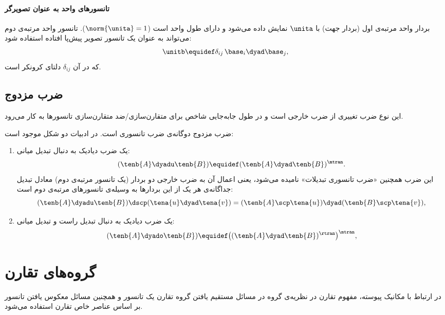 \paragraph{تانسورهای واحد به عنوان تصویرگر} بردار واحد مرتبه‌ی اول (بردار جهت) با $\unita$ نمایش داده می‌شود و دارای طول واحد است ($\norm{\unita}=1$). تانسور واحد مرتبه‌ی دوم می‌تواند به عنوان یک تانسور تصویر پیش‌پا افتاده استفاده شود:
\begin{equation}\label{eq:unitb}
    \unitb\equidef\delta_{ij}\,\base_i\dyad \base_j,
\end{equation}
که در آن $\delta_{ij}$ دلتای کرونکر است.

\subsection{ضرب مزدوج}
این نوع ضرب تغییری از ضرب خارجی است و در طول جابه‌جایی شاخص برای متقارن‌سازی/ضد متقارن‌سازی تانسورها به کار می‌رود.

\begin{definition}
    ضرب مزدوج دوگانه‌ی ضرب تانسوری است. در ادبیات دو شکل موجود است:
    \begin{enumerate}
        \item یک ضرب دیادیک به دنبال تبدیل میانی:
              \begin{equation}
                  (\tenb{A}\dyadu\tenb{B})\equidef(\tenb{A}\dyad\tenb{B})^\mtran.
              \end{equation}
              این ضرب همچنین «ضرب تانسوری تبدیلات» نامیده می‌شود، یعنی اعمال آن به ضرب خارجی دو بردار (یک تانسور مرتبه‌ی دوم) معادل تبدیل جداگانه‌ی هر یک از این بردارها به وسیله‌ی تانسورهای مرتبه‌ی دوم است:
              \begin{equation}
                  (\tenb{A}\dyadu\tenb{B})\dscp(\tena{u}\dyad\tena{v})= (\tenb{A}\scp\tena{u})
                  \dyad(\tenb{B}\scp\tena{v}),
              \end{equation}

        \item یک ضرب دیادیک به دنبال تبدیل راست و تبدیل میانی:
              \begin{equation}
                  (\tenb{A}\dyado\tenb{B})\equidef\big((\tenb{A}\dyad\tenb{B})^\rtran\big)^\mtran,
              \end{equation}
    \end{enumerate}
\end{definition}

\section{گروه‌های تقارن}
در ارتباط با مکانیک پیوسته، مفهوم تقارن در نظریه‌ی گروه در مسائل مستقیم یافتن گروه تقارن یک تانسور و همچنین مسائل معکوس یافتن تانسور بر اساس عناصر خاص تقارن استفاده می‌شود.

